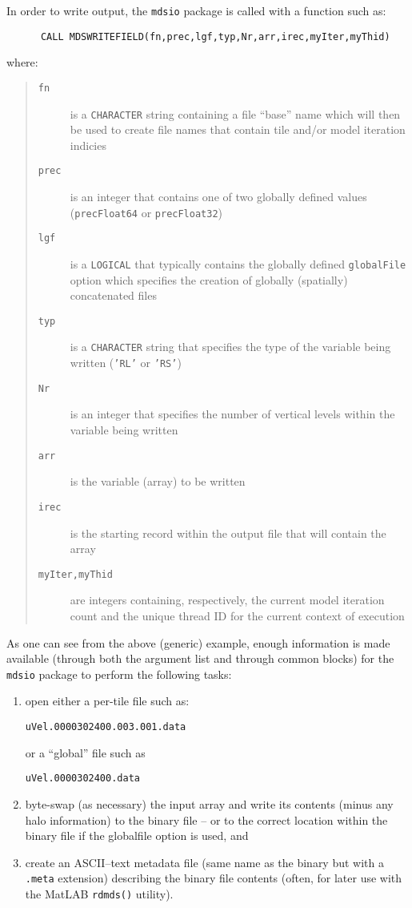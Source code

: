 In order to write output, the \texttt{mdsio} package is called with a
function such as:
\begin{verbatim}
      CALL MDSWRITEFIELD(fn,prec,lgf,typ,Nr,arr,irec,myIter,myThid)
\end{verbatim}
where:
\begin{quote}
  \begin{description}
  \item[\texttt{fn}] is a \texttt{CHARACTER} string containing a file
    ``base'' name which will then be used to create file names that
    contain tile and/or model iteration indicies
  \item[\texttt{prec}] is an integer that contains one of two globally
    defined values (\texttt{precFloat64} or \texttt{precFloat32})
  \item[\texttt{lgf}] is a \texttt{LOGICAL} that typically contains
    the globally defined \texttt{globalFile} option which specifies
    the creation of globally (spatially) concatenated files
  \item[\texttt{typ}] is a \texttt{CHARACTER} string that specifies
    the type of the variable being written (\texttt{'RL'} or
    \texttt{'RS'})
  \item[\texttt{Nr}] is an integer that specifies the number of
    vertical levels within the variable being written
  \item[\texttt{arr}] is the variable (array) to be written
  \item[\texttt{irec}] is the starting record within the output file
    that will contain the array
  \item[\texttt{myIter,myThid}] are integers containing, respectively,
    the current model iteration count and the unique thread ID for the
    current context of execution
  \end{description}  
\end{quote}
As one can see from the above (generic) example, enough information is
made available (through both the argument list and through common blocks)
for the \texttt{mdsio} package to perform the following tasks:
\begin{enumerate}
\item open either a per-tile file such as:
  \begin{center}
    \texttt{uVel.0000302400.003.001.data}
  \end{center}
  or a ``global'' file such as
  \begin{center}
    \texttt{uVel.0000302400.data}
  \end{center}
\item byte-swap (as necessary) the input array and write its contents
  (minus any halo information) to the binary file -- or to the correct
  location within the binary file if the globalfile option is used, and 
\item create an ASCII--text metadata file (same name as the binary but
  with a \texttt{.meta} extension) describing the binary file contents
  (often, for later use with the MatLAB \texttt{rdmds()} utility).
\end{enumerate}

